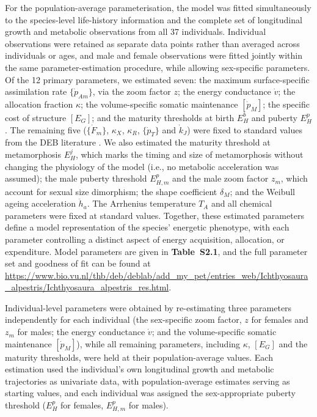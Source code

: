 \documentclass[12pt]{article}
\begin{document}
For the population-average parameterisation, the model was fitted simultaneously to the species-level life-history information and the complete set of longitudinal growth and metabolic observations from all 37 individuals. Individual observations were retained as separate data points rather than averaged across individuals or ages, and male and female observations were fitted jointly within the same parameter-estimation procedure, while allowing sex-specific parameters. Of the 12 primary parameters, we estimated seven: the maximum surface-specific assimilation rate $\{\dot{p}_{Am}\}$, via the zoom factor $z$; the energy conductance $\dot{v}$; the allocation fraction $\kappa$; the volume-specific somatic maintenance $[\dot{p}_M]$; the specific cost of structure $[E_G]$; and the maturity thresholds at birth $E_H^b$ and puberty $E_H^p$. The remaining five ($\{\dot{F}_m\}$, $\kappa_X$, $\kappa_R$, $\{\dot{p}_T\}$ and $\dot{k}_J$) were fixed to standard values from the DEB literature \parencite{kooijman2010,kearney2013}. We also estimated the maturity threshold at metamorphosis $E_H^j$, which marks the timing and size of metamorphosis without changing the physiology of the model (i.e., no metabolic acceleration was assumed); the male puberty threshold $E_{H,m}^p$ and the male zoom factor $z_m$, which account for sexual size dimorphism; the shape coefficient $\delta_M$; and the Weibull ageing acceleration $\ddot{h}_a$. The Arrhenius temperature $T_A$ and all chemical parameters were fixed at standard values. Together, these estimated parameters define a model representation of the species' energetic phenotype, with each parameter controlling a distinct aspect of energy acquisition, allocation, or expenditure. Model parameters are given in \textbf{Table~S2.1}, and the full parameter set and goodness of fit can be found at \url{https://www.bio.vu.nl/thb/deb/deblab/add_my_pet/entries_web/Ichthyosaura_alpestris/Ichthyosaura_alpestris_res.html}.

Individual-level parameters were obtained by re-estimating three parameters independently for each individual (the sex-specific zoom factor, $z$ for females and $z_m$ for males; the energy conductance $\dot{v}$; and the volume-specific somatic maintenance $[\dot{p}_M]$), while all remaining parameters, including $\kappa$, $[E_G]$ and the maturity thresholds, were held at their population-average values. Each estimation used the individual's own longitudinal growth and metabolic trajectories as univariate data, with population-average estimates serving as starting values, and each individual was assigned the sex-appropriate puberty threshold ($E_H^p$ for females, $E_{H,m}^p$ for males).
\end{document}
